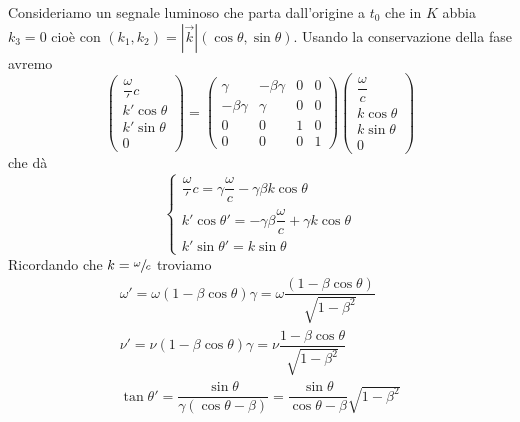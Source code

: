 \documentclass[12pt,a4paper,titlepage, twoside, openright]{book}
\numberwithin{equation}{chapter}
\begin{document}
Consideriamo un segnale luminoso che parta dall'origine a $t_0$ che in $K$ abbia $k_3=0$ cioè con $(k_1,k_2)=\left|\vec{k}\right|(\cos{\theta},\sin{\theta})$.
Usando la conservazione della fase avremo
\[
\left(\begin{array}{c}
\dfrac{\omega}'{c} \\ k'\cos{\theta} \\ k'\sin{\theta} \\ 0
\end{array}\right)=\left(\begin{array}{cccc}
\gamma & -\beta\gamma & 0 & 0 \\
-\beta\gamma & \gamma & 0 & 0 \\
0 & 0 & 1 & 0 \\
0 & 0 & 0 & 1
\end{array}\right)\left(\begin{array}{c}
\dfrac{\omega}{c} \\ k\cos{\theta} \\ k\sin{\theta} \\0
\end{array}\right)
\]
che dà
\[
\begin{cases}
\dfrac{\omega }'{c} = \gamma \dfrac{\omega}{c} -\gamma\beta k\cos{\theta} \\
k'\cos{\theta}'=-\gamma\beta\dfrac{\omega}{c} + \gamma k \cos{\theta} \\
k'\sin{\theta}'=k\sin{\theta}
\end{cases}
\]
Ricordando che $k=\sfrac{\omega}{c}$ troviamo
\begin{gather}
\omega'=\omega \left(1-\beta\cos{\theta}\right)\gamma=\omega \dfrac{\left( 1-\beta\cos{\theta}\right)}{\sqrt{1-\beta^2}} \\
\nu' = \nu \left(1-\beta\cos{\theta}\right)\gamma = \nu \dfrac{1-\beta\cos{\theta}}{\sqrt{1-\beta^2}}\\
\tan{\theta}'=\dfrac{\sin{\theta}}{\gamma\left(\cos{\theta}-\beta\right)}=\dfrac{\sin{\theta}}{\cos{\theta}-\beta}\sqrt{1-\beta^2}
\end{gather}
\end{document}
